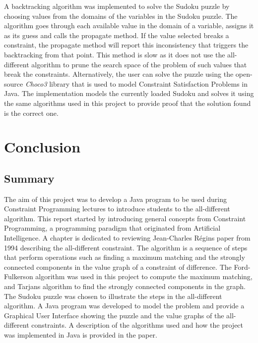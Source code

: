 \documentclass{l4proj}
\begin{document}
\noindent A backtracking algorithm was implemented to solve the Sudoku puzzle by choosing values from the domains of the variables in the Sudoku puzzle. The algorithm goes through each available value in the domain of a variable, assigns it as its guess and calls the propagate method. If the value selected breaks a constraint, the propagate method will report this inconsistency that triggers the backtracking from that point. This method is slow as it does not use the all-different algorithm to prune the search space of the problem of such values that break the constraints. Alternatively, the user can solve the puzzle using the open-source \textit{Choco3} library \cite{choco} that is used to model Constraint Satisfaction Problems in Java. The implementation models the currently loaded Sudoku and solves it using the same algorithms used in this project to provide proof that the solution found is the correct one.

\chapter{Conclusion}
\label{chap7conclusion} 
\section{Summary}
The aim of this project was to develop a Java program to be used during Constraint Programming lectures to introduce students to the all-different algorithm. This report started by introducing general concepts from Constraint Programming, a programming paradigm that originated from Artificial Intelligence. A chapter is dedicated to reviewing Jean-Charles R\'egin\textquotesingle s paper \cite{regin1994filtering} from 1994 describing the all-different constraint. The algorithm is a sequence of steps that perform operations such as finding a maximum matching and the strongly connected components in the value graph of a constraint of difference. The Ford-Fulkerson algorithm \cite{ford1956maximal} was used in this project to compute the maximum matching, and Tarjan\textquotesingle s algorithm \cite{tarjan1972depth} to find the strongly connected components in the graph. The Sudoku puzzle was chosen to illustrate the steps in the all-different algorithm. A Java program was developed to model the problem and provide a Graphical User Interface showing the puzzle and the value graphs of the all-different constraints. A description of the algorithms used and how the project was implemented in Java is provided in the paper.
\end{document}
